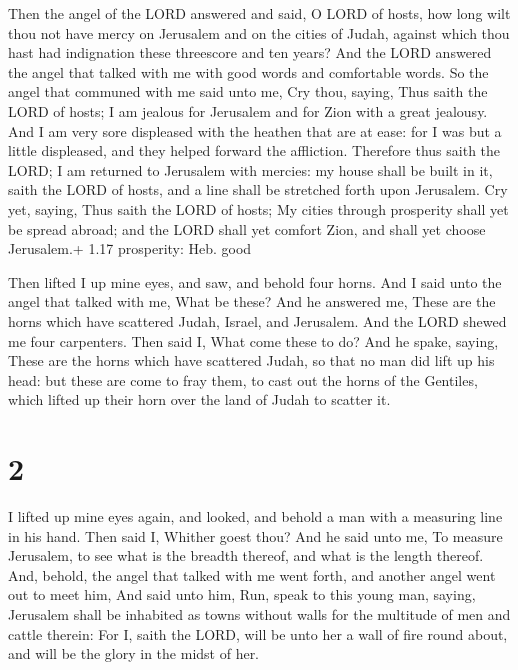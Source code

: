  Then the angel of the LORD answered and said, O LORD of
hosts, how long wilt thou not have mercy on Jerusalem and on the cities
of Judah, against which thou hast had indignation these threescore and
ten years?  And the LORD answered the angel that talked
with me with good words and comfortable words.  So the
angel that communed with me said unto me, Cry thou, saying, Thus saith
the LORD of hosts; I am jealous for Jerusalem and for Zion with a great
jealousy.  And I am very sore displeased with the heathen
that are at ease: for I was but a little displeased, and they helped
forward the affliction.  Therefore thus saith the LORD; I
am returned to Jerusalem with mercies: my house shall be built in it,
saith the LORD of hosts, and a line shall be stretched forth upon
Jerusalem.  Cry yet, saying, Thus saith the LORD of hosts;
My cities through prosperity shall yet be spread abroad; and the LORD
shall yet comfort Zion, and shall yet choose Jerusalem.+ 1.17
prosperity: Heb. good

 Then lifted I up mine eyes, and saw, and behold four
horns.  And I said unto the angel that talked with me, What
be these? And he answered me, These are the horns which have scattered
Judah, Israel, and Jerusalem.  And the LORD shewed me four
carpenters.  Then said I, What come these to do? And he
spake, saying, These are the horns which have scattered Judah, so that
no man did lift up his head: but these are come to fray them, to cast
out the horns of the Gentiles, which lifted up their horn over the land
of Judah to scatter it.

\hypertarget{section-1}{%
\section{2}\label{section-1}}

 I lifted up mine eyes again, and looked, and behold a man
with a measuring line in his hand.  Then said I, Whither
goest thou? And he said unto me, To measure Jerusalem, to see what is
the breadth thereof, and what is the length thereof.  And,
behold, the angel that talked with me went forth, and another angel went
out to meet him,  And said unto him, Run, speak to this
young man, saying, Jerusalem shall be inhabited as towns without walls
for the multitude of men and cattle therein:  For I, saith
the LORD, will be unto her a wall of fire round about, and will be the
glory in the midst of her.

